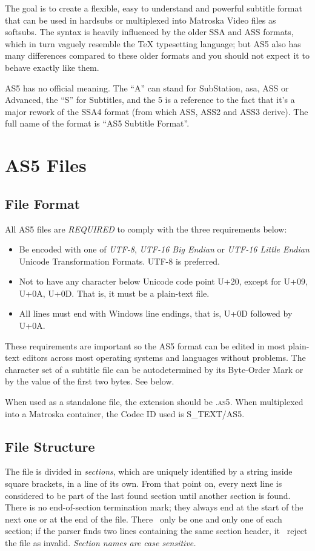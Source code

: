 \documentclass{spec}
\begin{document}
The goal is to create a flexible, easy to understand and powerful subtitle format
that can be used in hardsubs or multiplexed into Matroska Video\cite{mkv} files as
softsubs. The syntax is heavily influenced by the older SSA and ASS formats, which in
turn vaguely resemble the TeX typesetting language; but AS5 also has many differences
compared to these older formats and you should not expect it to behave exactly like them.

AS5 has no official meaning. The ``A'' can stand for SubStation, asa, ASS or Advanced,
the ``S'' for Subtitles, and the 5 is a reference to the fact that it's a major
rework of the SSA4 format (from which ASS, ASS2 and ASS3 derive). The full
name of the format is ``AS5 Subtitle Format''.


\newpage
\section{AS5 Files}
\subsection{File Format}
All AS5 files are \emph{REQUIRED} to comply with the three requirements below:

\begin{itemize}
\item Be encoded with one of \emph{UTF-8}\cite{UTF-8}, \emph{UTF-16 Big Endian}
\cite{UTF-16} or \emph{UTF-16 Little Endian} Unicode Transformation Formats. UTF-8 is
preferred.
\item Not to have any character below Unicode code point U+20, except for U+09, U+0A, U+0D.
That is, it must be a plain-text file.
\item All lines must end with Windows line endings, that is, U+0D followed by U+0A.
\end{itemize}

These requirements are important so the AS5 format can be edited in most plain-text editors
across most operating systems and languages without problems. The character set of a
subtitle file can be autodetermined by its Byte-Order Mark or by the value of the first
two bytes. See below.

When used as a standalone file, the extension should be \textsc{.as5}. When multiplexed
into a Matroska container, the Codec ID used is \textsc{S\_TEXT/AS5}.



\subsection{File Structure}
The file is divided in \emph{sections}, which are uniquely identified by a string inside
square brackets, in a line of its own. From that point on, every next line is considered
to be part of the last found section until another section is found. There is no end-of-section
termination mark; they always end at the start of the next one or at the end of the file.
There \must\ only be one and only one of each section; if the parser finds two lines containing
the same section header, it \must\ reject the file as invalid. \emph{Section names are case sensitive.}
\end{document}
